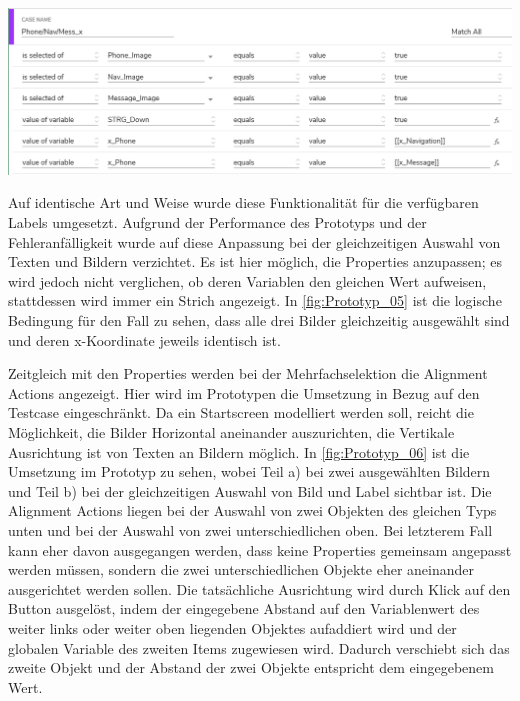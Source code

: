 \begin{center}
  \includegraphics[scale=0.5]{figures/Prototyp_05.PNG}
  \label{fig:Prototyp_05}
\end{center}

Auf identische Art und Weise wurde diese Funktionalität für die verfügbaren Labels umgesetzt.
Aufgrund der Performance des Prototyps und der Fehleranfälligkeit wurde auf diese Anpassung bei der gleichzeitigen Auswahl von Texten und Bildern verzichtet.
Es ist hier möglich, die Properties anzupassen; es wird jedoch nicht verglichen, ob deren Variablen den gleichen Wert aufweisen, stattdessen wird immer ein Strich angezeigt.
In \cref{fig:Prototyp_05} ist die logische Bedingung für den Fall zu sehen, dass alle drei Bilder gleichzeitig ausgewählt sind und deren x-Koordinate jeweils identisch ist.

Zeitgleich mit den Properties werden bei der Mehrfachselektion die Alignment Actions angezeigt.
Hier wird im Prototypen die Umsetzung in Bezug auf den Testcase eingeschränkt.
Da ein Startscreen modelliert werden soll, reicht die Möglichkeit, die Bilder Horizontal aneinander auszurichten, die Vertikale Ausrichtung ist von Texten an Bildern möglich.
In \cref{fig:Prototyp_06} ist die Umsetzung im Prototyp zu sehen, wobei Teil a) bei zwei ausgewählten Bildern und Teil b) bei der gleichzeitigen Auswahl von Bild und Label sichtbar ist.
Die Alignment Actions liegen bei der Auswahl von zwei Objekten des gleichen Typs unten und bei der Auswahl von zwei unterschiedlichen oben.
Bei letzterem Fall kann eher davon ausgegangen werden, dass keine Properties gemeinsam angepasst werden müssen, sondern die zwei unterschiedlichen Objekte eher aneinander ausgerichtet werden sollen.
Die tatsächliche Ausrichtung wird durch Klick auf den Button ausgelöst, indem der eingegebene Abstand auf den Variablenwert des weiter links oder weiter oben liegenden Objektes aufaddiert wird und der globalen Variable des zweiten Items zugewiesen wird.
Dadurch verschiebt sich das zweite Objekt und der Abstand der zwei Objekte entspricht dem eingegebenem Wert.


